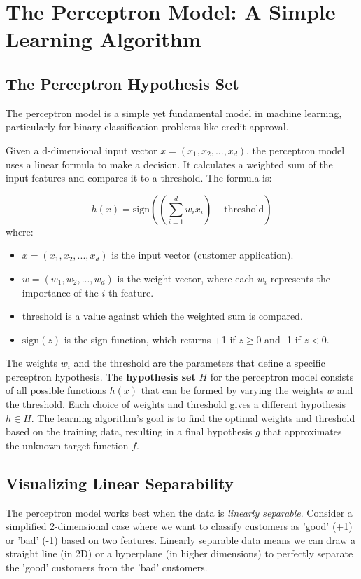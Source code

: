 \documentclass{article}
\begin{document}
\section{The Perceptron Model: A Simple Learning Algorithm}
\subsection{The Perceptron Hypothesis Set}
The perceptron model is a simple yet fundamental model in machine learning, particularly for binary classification problems like credit approval.

Given a d-dimensional input vector $x = (x_1, x_2, ..., x_d)$, the perceptron model uses a linear formula to make a decision.  It calculates a weighted sum of the input features and compares it to a threshold. The formula is:

\[
h(x) = \text{sign}\left( \left( \sum_{i=1}^{d} w_i x_i \right) - \text{threshold} \right)
\]
where:
\begin{itemize}
    \item $x = (x_1, x_2, ..., x_d)$ is the input vector (customer application).
    \item $w = (w_1, w_2, ..., w_d)$ is the weight vector, where each $w_i$ represents the importance of the $i$-th feature.
    \item $\text{threshold}$ is a value against which the weighted sum is compared.
    \item $\text{sign}(z)$ is the sign function, which returns +1 if $z \geq 0$ and -1 if $z < 0$.
\end{itemize}

The weights $w_i$ and the threshold are the parameters that define a specific perceptron hypothesis. The \textbf{hypothesis set} $H$ for the perceptron model consists of all possible functions $h(x)$ that can be formed by varying the weights $w$ and the threshold.  Each choice of weights and threshold gives a different hypothesis $h \in H$. The learning algorithm's goal is to find the optimal weights and threshold based on the training data, resulting in a final hypothesis $g$ that approximates the unknown target function $f$.

\subsection{Visualizing Linear Separability}
The perceptron model works best when the data is \textit{linearly separable}.  Consider a simplified 2-dimensional case where we want to classify customers as 'good' (+1) or 'bad' (-1) based on two features.  Linearly separable data means we can draw a straight line (in 2D) or a hyperplane (in higher dimensions) to perfectly separate the 'good' customers from the 'bad' customers.
\end{document}
